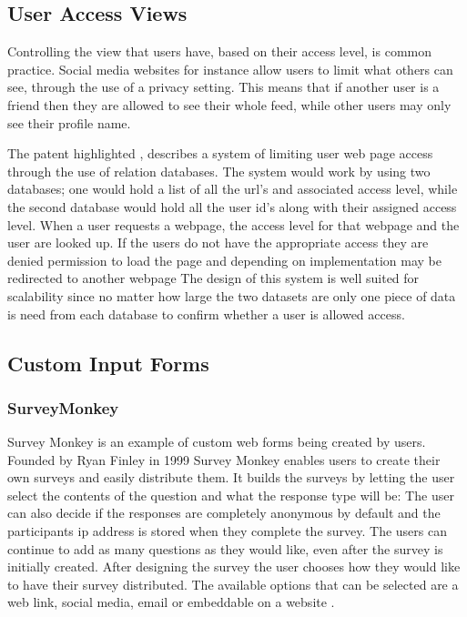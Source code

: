 \documentclass[12pt]{article}  %
\begin{document}
\newpage
\subsection{User Access Views}


Controlling the view that users have, based on their access level, is common practice. Social media websites for instance allow users to limit what others  can see, through the use of a privacy setting. This means that if another user is a friend then they are allowed to see their whole feed, while other users may only see their profile name.


The patent highlighted \cite{baker_system_1997}, describes a system of limiting user web page access through the use of relation databases. The system would work by using two databases; one would hold a list of all the url's and associated access level, while the second database would hold all the user id's along with their assigned access level. When a user requests a webpage, the access level for that webpage and the user are looked up. If the users do not have the appropriate access they are denied permission to load the page and depending on implementation may be redirected to another webpage
The design of this system is well suited for scalability since no matter how large the two datasets are only one piece of data is need from each database to confirm whether a user is allowed access.




\subsection{Custom Input Forms}


\subsubsection{SurveyMonkey}
Survey Monkey \cite{finley_surveymonkey_1999} is an example of custom web forms being created by users. Founded by Ryan Finley in 1999 Survey Monkey enables users to create their own surveys and easily distribute them. It builds the surveys by letting the user select the contents of the question and what the response type will be: The user can also decide if the responses are completely anonymous by default and the participants ip address is stored when they complete the survey. The users can continue to add as many questions as they would like, even after the survey is initially created. After designing the survey the user chooses how they would like to have their survey distributed. The available options that can be selected are a web link, social media, email or embeddable on a website \cite{waclawski_how_2012} .
\end{document}
